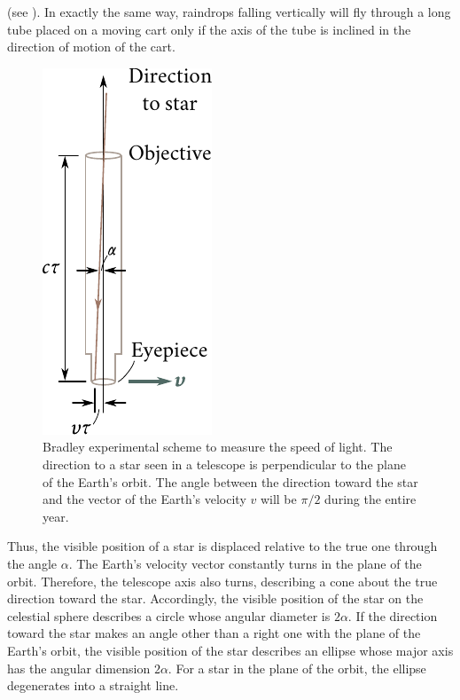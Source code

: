(see ).
In exactly the same way, raindrops falling vertically will fly through a long tube placed on a moving cart only if the axis of the tube is inclined in the direction of motion of the cart.

\begin{figure}[t]
	\begin{center}
		\includegraphics[scale=1]{figures/ch_21/fig_21_1.pdf}
        \caption[]{Bradley experimental scheme to measure the speed of light. The direction to a star seen in a telescope is perpendicular to the plane of the Earth's orbit. The angle between the direction toward the star and the vector of the Earth's velocity $v$ will be $\pi/2$ during the entire year.}
		\label{fig:21_1}
	\end{center}
	\vspace{-0.8cm}
\end{figure}

Thus, the visible position of a star is displaced relative to the true one through the angle $\alpha$.
The Earth's velocity vector constantly turns in the plane of the orbit.
Therefore, the telescope axis also turns, describing a cone about the true direction toward the star.
Accordingly, the visible position of the star on the celestial sphere describes a circle whose angular diameter is $2\alpha$.
If the direction toward the star makes an angle other than a right one with the plane of the Earth's orbit, the visible position of the star describes an ellipse whose major axis has the angular dimension $2\alpha$.
For a star in the plane of the orbit, the ellipse degenerates into a straight line.

